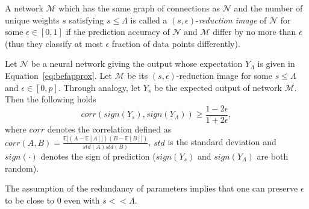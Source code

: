 \documentclass[twoside]{article}
\begin{document}
\begin{definition}
A network $\mathcal{M}$ which has the same graph of connections as $\mathcal{N}$ and the number of unique weights $s$ satisfying $s \leq \Lambda$ is called a $(s,\epsilon)$-\textit{reduction image} of $\mathcal{N}$ for some $\epsilon \in [0,1]$ if the prediction accuracy of $\mathcal{N}$ and $\mathcal{M}$ differ by no more than $\epsilon$ (thus they classify at most $\epsilon$ fraction of data points differently).
\end{definition}

\begin{theorem}
Let $\mathcal{N}$ be a neural network giving the output whose expectation $Y_{\Lambda}$ is given in Equation~\ref{eq:befapprox}. Let $\mathcal{M}$ be its $(s,\epsilon)$-reduction image for some $s \leq \Lambda$ and $\epsilon \in [0,p]$. Through analogy, let $Y_s$ be the expected output of network $\mathcal{M}$. Then the following holds
\[corr(sign(Y_s),sign(Y_{\Lambda})) \geq \frac{1-2\epsilon}{1+2\epsilon},
\]
where $corr$ denotes the correlation defined as $corr(A,B) = \frac{\mathbb{E}[(A - \mathbb{E}[A]])(B - \mathbb{E}[B]])}{std(A)std(B)}$, $std$ is the standard deviation and $sign(\cdot)$ denotes the sign of prediction ($sign(Y_s)$ and $sign(Y_{\Lambda})$ are both random).
\label{thm:redun}
\end{theorem}

The assumption of the redundancy of parameters implies that one can preserve $\epsilon$ to be close to $0$ even with $s << \Lambda$.
\end{document}
